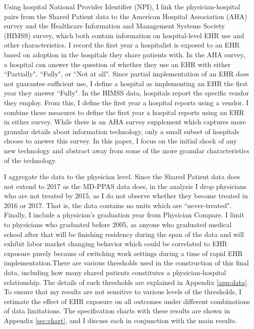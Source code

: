 \documentclass[12pt]{article}
\begin{document}
Using hospital National Provider Identifier (NPI), I link the physician-hospital pairs from the Shared Patient data to the American Hospital Association (AHA) survey and the Healthcare Information and Management Systems Society (HIMSS) survey, which both contain information on hospital-level EHR use and other characteristics. I record the first year a hospitalist is exposed to an EHR based on adoption in the hospitals they share patients with. In the AHA survey, a hospital can answer the question of whether they use an EHR with either ``Partially", ``Fully", or ``Not at all". Since partial implementation of an EHR does not guarantee sufficient use, I define a hospital as implementing an EHR the first year they answer ``Fully". In the HIMSS data, hospitals report the specific vendor they employ. From this, I define the first year a hospital reports using a vendor. I combine these measures to define the first year a hospital reports using an EHR in either survey. While there is an AHA survey supplement which captures more granular details about information technology, only a small subset of hospitals choose to answer this survey. In this paper, I focus on the initial shock of any new technology and abstract away from some of the more granular characteristics of the technology.

I aggregate the data to the physician level. Since the Shared Patient data does not extend to 2017 as the MD-PPAS data does, in the analysis I drop physicians who are not treated by 2015, as I do not observe whether they become treated in 2016 or 2017. That is, the data contains no units which are ``never-treated". Finally, I include a physician's graduation year from Physician Compare. I limit to physicians who graduated before 2005, as anyone who graduated medical school after that will be finishing residency during the span of the data and will exhibit labor market changing behavior which could be correlated to EHR exposure purely because of switching work settings during a time of rapid EHR implementation.There are various thresholds used in the construction of this final data, including how many shared patients constitutes a physician-hospital relationship. The details of such thresholds are explained in Appendix \ref{app:data}. To ensure that my results  are not sensitive to various levels of the thresholds, I estimate the effect of EHR exposure on all outcomes under different combinations of data limitations. The specification charts with these results are shown in Appendix \ref{sec:chart}, and I discuss each in conjunction with the main results. 
\end{document}

